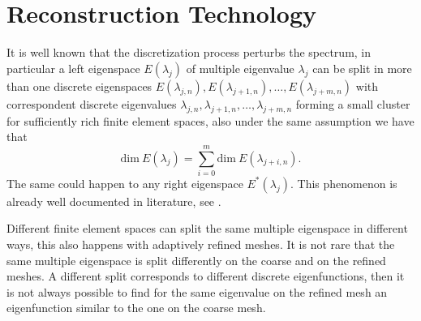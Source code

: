\documentclass[preprint,12pt]{elsarticle}
\begin{document}
 



\section{Reconstruction Technology}\label{sec:reco}

It is well known that the discretization process perturbs the spectrum, in particular a left eigenspace $E(\lambda_j)$ of multiple eigenvalue $\lambda_j$ can be split in more than one discrete eigenspaces $E(\lambda_{j,n}),E(\lambda_{j+1,n}),\dots,E(\lambda_{j+m,n})$ with correspondent discrete eigenvalues $\lambda_{j,n},\lambda_{j+1,n},\dots,\lambda_{j+m,n}$ forming a small cluster for sufficiently rich finite element spaces, also under the same assumption we have that
$$
\mathrm{dim}\ E(\lambda_j)=\sum_{i=0}^m\mathrm{dim}\ E(\lambda_{j+i,n}).
$$
The same could happen to any right eigenspace $E^*(\lambda_j)$.
This phenomenon is already well documented in literature,  see \cite{strang, babuska, hackbusch}.

Different finite element spaces can split the same multiple eigenspace in different ways, this also happens with adaptively refined meshes. It is not rare that the same multiple eigenspace is split differently on the coarse and on the refined meshes. A different split corresponds to different discrete eigenfunctions, then it is not always possible to find for the same eigenvalue on the refined mesh an eigenfunction similar to the one on the coarse mesh.
\end{document}
